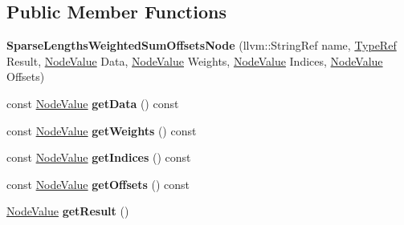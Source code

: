 \subsection*{Public Member Functions}
\begin{DoxyCompactItemize}
\item 
\mbox{\label{classglow_1_1_sparse_lengths_weighted_sum_offsets_node_aba3f50076a8bc49319499b548c917274}} 
{\bfseries Sparse\+Lengths\+Weighted\+Sum\+Offsets\+Node} (llvm\+::\+String\+Ref name, \hyperlink{structglow_1_1_type}{Type\+Ref} Result, \hyperlink{structglow_1_1_node_value}{Node\+Value} Data, \hyperlink{structglow_1_1_node_value}{Node\+Value} Weights, \hyperlink{structglow_1_1_node_value}{Node\+Value} Indices, \hyperlink{structglow_1_1_node_value}{Node\+Value} Offsets)
\item 
\mbox{\label{classglow_1_1_sparse_lengths_weighted_sum_offsets_node_a316795135d67afb6aa4a52fc7cf01d80}} 
const \hyperlink{structglow_1_1_node_value}{Node\+Value} {\bfseries get\+Data} () const
\item 
\mbox{\label{classglow_1_1_sparse_lengths_weighted_sum_offsets_node_a39a31be4023125f6a77406d6e78c3bf7}} 
const \hyperlink{structglow_1_1_node_value}{Node\+Value} {\bfseries get\+Weights} () const
\item 
\mbox{\label{classglow_1_1_sparse_lengths_weighted_sum_offsets_node_af49f015f7466bd9d4c4673b45162fb81}} 
const \hyperlink{structglow_1_1_node_value}{Node\+Value} {\bfseries get\+Indices} () const
\item 
\mbox{\label{classglow_1_1_sparse_lengths_weighted_sum_offsets_node_af5b8c21230b504f5ac7539d9d4ff3f0d}} 
const \hyperlink{structglow_1_1_node_value}{Node\+Value} {\bfseries get\+Offsets} () const
\item 
\mbox{\label{classglow_1_1_sparse_lengths_weighted_sum_offsets_node_ab5fb8b627efea276251dbcdee18872e0}} 
\hyperlink{structglow_1_1_node_value}{Node\+Value} {\bfseries get\+Result} ()

\end{DoxyCompactItemize}
